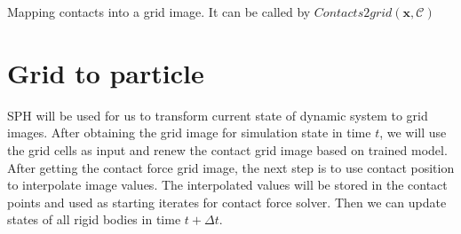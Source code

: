     \begin{algorithm}[!h]
        \caption{Mapping contacts into a grid image. It can be called by $Contacts2grid(\mathbf{x}, \mathcal{C})$}
        \label{contactgrid}
    \end{algorithm}


\section{Grid to particle}
    SPH will be used for us to transform current state of dynamic system to grid images. After obtaining the grid image for simulation state in time $t$, we will use the grid cells as input and renew the contact grid image based on trained model. After getting the contact force grid image, the next step is to use contact position to interpolate image values. The interpolated values will be stored in the contact points and used as starting iterates for contact force solver. Then we can update states of all rigid bodies in time $t+\Delta{t}$.


